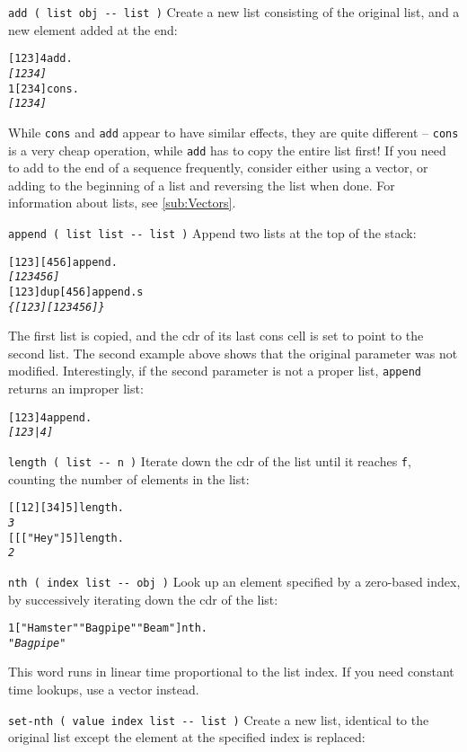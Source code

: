 \documentclass[english]{article}
\begin{document}
\texttt{add ( list obj -{}- list )} Create a new list consisting of
the original list, and a new element added at the end:

\begin{alltt}
{[} 1 2 3 {]} 4 add .
\emph{{[} 1 2 3 4 {]}}
1 {[} 2 3 4 {]} cons .
\emph{{[} 1 2 3 4 {]}}
\end{alltt}
While \texttt{cons} and \texttt{add} appear to have similar effects,
they are quite different -- \texttt{cons} is a very cheap operation,
while \texttt{add} has to copy the entire list first! If you need to add to the end of a sequence frequently, consider either using a vector, or adding to the beginning of a list and reversing the list when done. For information about lists, see \ref{sub:Vectors}.

\texttt{append ( list list -{}- list )} Append two lists at the
top of the stack:

\begin{alltt}
{[} 1 2 3 {]} {[} 4 5 6 {]} append .
\emph{{[} 1 2 3 4 5 6 {]}}
{[} 1 2 3 {]} dup {[} 4 5 6 {]} append .s
\emph{\{ {[} 1 2 3 {]} {[} 1 2 3 4 5 6 {]} \}}
\end{alltt}
The first list is copied, and the cdr of its last cons cell is set
to point to the second list. The second example above shows that the original
parameter was not modified. Interestingly, if the second parameter
is not a proper list, \texttt{append} returns an improper list:

\begin{alltt}
{[} 1 2 3 {]} 4 append .
\emph{{[} 1 2 3 | 4 {]}}
\end{alltt}
\texttt{length ( list -{}- n )} Iterate down the cdr of the list until
it reaches \texttt{f}, counting the number of elements in the list:

\begin{alltt}
{[} {[} 1 2 {]} {[} 3 4 {]} 5 {]} length .
\emph{3}
{[} {[} {[} "Hey" {]} 5 {]} length .
\emph{2}
\end{alltt}
\texttt{nth ( index list -{}- obj )} Look up an element specified
by a zero-based index, by successively iterating down the cdr of the
list:

\begin{alltt}
1 {[} "Hamster" "Bagpipe" "Beam" {]} nth .
\emph{"Bagpipe"}
\end{alltt}
This word runs in linear time proportional to the list index. If you
need constant time lookups, use a vector instead.

\texttt{set-nth ( value index list -{}- list )} Create a new list,
identical to the original list except the element at the specified
index is replaced:
\end{document}
